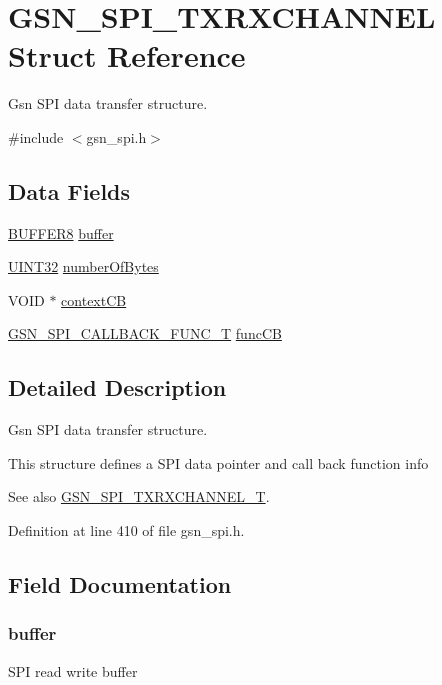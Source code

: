 \hypertarget{a00241}{
\section{GSN\_\-SPI\_\-TXRXCHANNEL Struct Reference}
\label{a00241}
}


Gsn SPI data transfer structure.  




{\ttfamily \#include $<$gsn\_\-spi.h$>$}

\subsection*{Data Fields}
\begin{DoxyCompactItemize}
\item 
\hyperlink{a00006}{BUFFER8} \hyperlink{a00241_a1941d7a126e0456900f127bbe67adfe0}{buffer}
\item 
\hyperlink{a00660_gae1e6edbbc26d6fbc71a90190d0266018}{UINT32} \hyperlink{a00241_aa38439c1a3431e9af92418009b525efa}{numberOfBytes}
\item 
VOID $\ast$ \hyperlink{a00241_a2898b010839acbc30fb49ec89189292c}{contextCB}
\item 
\hyperlink{a00655_gad27c6db61273e0b521637db94b638cdb}{GSN\_\-SPI\_\-CALLBACK\_\-FUNC\_\-T} \hyperlink{a00241_a7565371ad01b87c0d5ea21f355505f4b}{funcCB}
\end{DoxyCompactItemize}


\subsection{Detailed Description}
Gsn SPI data transfer structure. 

This structure defines a SPI data pointer and call back function info

\begin{DoxySeeAlso}{See also}
\hyperlink{a00655_ga0cdbeb0b657e6192938aebc1aaf793de}{GSN\_\-SPI\_\-TXRXCHANNEL\_\-T}. 
\end{DoxySeeAlso}


Definition at line 410 of file gsn\_\-spi.h.



\subsection{Field Documentation}
\hypertarget{a00241_a1941d7a126e0456900f127bbe67adfe0}{
\subsubsection[{buffer}]{ {\bf buffer}}}
\label{a00241_a1941d7a126e0456900f127bbe67adfe0}
SPI read write buffer 

